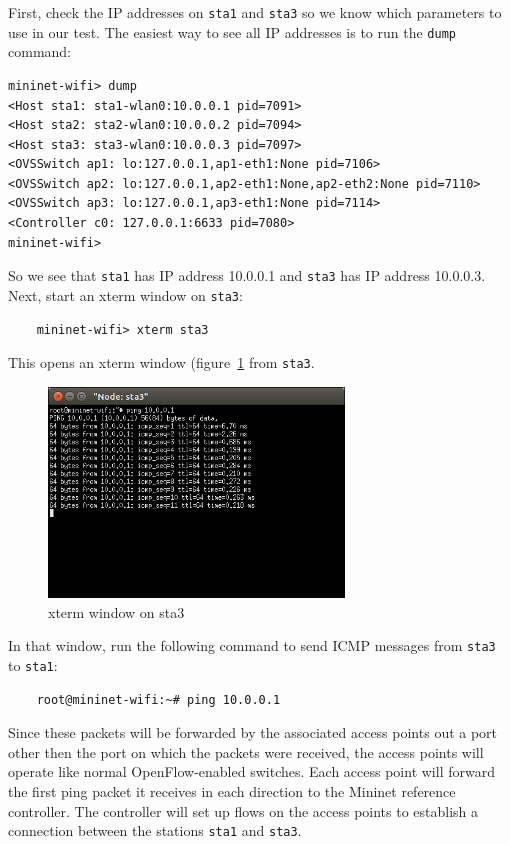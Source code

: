 First, check the IP addresses on \texttt{sta1} and \texttt{sta3} so we know which parameters to use in our test. The easiest way to see all IP addresses is to run the \texttt{dump} command:

\begin{verbatim}
mininet-wifi> dump
<Host sta1: sta1-wlan0:10.0.0.1 pid=7091>
<Host sta2: sta2-wlan0:10.0.0.2 pid=7094>
<Host sta3: sta3-wlan0:10.0.0.3 pid=7097>
<OVSSwitch ap1: lo:127.0.0.1,ap1-eth1:None pid=7106>
<OVSSwitch ap2: lo:127.0.0.1,ap2-eth1:None,ap2-eth2:None pid=7110>
<OVSSwitch ap3: lo:127.0.0.1,ap3-eth1:None pid=7114>
<Controller c0: 127.0.0.1:6633 pid=7080>
mininet-wifi> 
\end{verbatim}     

So we see that \texttt{sta1} has IP address 10.0.0.1 and \texttt{sta3} has IP address 10.0.0.3. Next, start an xterm window on \texttt{sta3}:

\begin{verbatim}
    mininet-wifi> xterm sta3
\end{verbatim}

This opens an xterm window (figure~\ref{fig:xterm} from \texttt{sta3}. 

\begin{figure}
    \centering
    \includegraphics[width=0.7\textwidth]{Pictures/mn-wifi-102.png}
    \caption{xterm window on sta3}
    \label{fig:xterm}
\end{figure}


In that window, run the following command to send ICMP messages from \texttt{sta3} to \texttt{sta1}:     

\begin{verbatim}
    root@mininet-wifi:~# ping 10.0.0.1
\end{verbatim}

Since these packets will be forwarded by the associated access points out a port other then the port on which the packets were received, the access points will operate like normal OpenFlow-enabled switches. Each access point will forward the first ping packet it receives in each direction to the Mininet reference controller. The controller will set up flows on the access points to establish a connection between the stations \texttt{sta1} and \texttt{sta3}.

